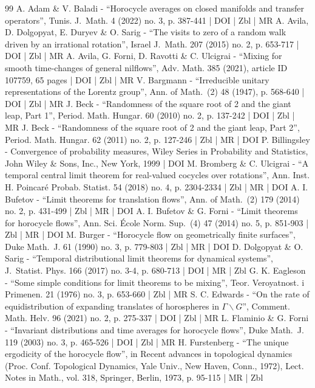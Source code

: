 \begin{thebibliography}{99}
A. Adam \& V. Baladi - “Horocycle averages on closed manifolds and transfer operators”, Tunis. J. Math. 4 (2022) no. 3, p. 387-441 | DOI | Zbl | MR
A. Avila, D. Dolgopyat, E. Duryev \& O. Sarig - “The visits to zero of a random walk driven by an irrational rotation”, Israel J. Math. 207 (2015) no. 2, p. 653-717 | DOI | Zbl | MR
A. Avila, G. Forni, D. Ravotti \& C. Ulcigrai - “Mixing for smooth time-changes of general nilflows”, Adv. Math. 385 (2021), article ID 107759, 65 pages | DOI | Zbl | MR
V. Bargmann - “Irreducible unitary representations of the Lorentz group”, Ann. of Math. (2) 48 (1947), p. 568-640 | DOI | Zbl | MR
J. Beck - “Randomness of the square root of 2 and the giant leap, Part 1”, Period. Math. Hungar. 60 (2010) no. 2, p. 137-242 | DOI | Zbl | MR
J. Beck - “Randomness of the square root of 2 and the giant leap, Part 2”, Period. Math. Hungar. 62 (2011) no. 2, p. 127-246 | Zbl | MR | DOI
P. Billingsley - Convergence of probability measures, Wiley Series in Probability and Statistics, John Wiley \& Sons, Inc., New York, 1999 | DOI
M. Bromberg \& C. Ulcigrai - “A temporal central limit theorem for real-valued cocycles over rotations”, Ann. Inst. H. Poincaré Probab. Statist. 54 (2018) no. 4, p. 2304-2334 | Zbl | MR | DOI
A. I. Bufetov - “Limit theorems for translation flows”, Ann. of Math. (2) 179 (2014) no. 2, p. 431-499 | Zbl | MR | DOI
A. I. Bufetov \& G. Forni - “Limit theorems for horocycle flows”, Ann. Sci. École Norm. Sup. (4) 47 (2014) no. 5, p. 851-903 | Zbl | MR | DOI
M. Burger - “Horocycle flow on geometrically finite surfaces”, Duke Math. J. 61 (1990) no. 3, p. 779-803 | Zbl | MR | DOI
D. Dolgopyat \& O. Sarig - “Temporal distributional limit theorems for dynamical systems”, J. Statist. Phys. 166 (2017) no. 3-4, p. 680-713 | DOI | MR | Zbl
G. K. Eagleson - “Some simple conditions for limit theorems to be mixing”, Teor. Veroyatnost. i Primenen. 21 (1976) no. 3, p. 653-660 | Zbl | MR
S. C. Edwards - “On the rate of equidistribution of expanding translates of horospheres in $\Gamma \backslash G$”, Comment. Math. Helv. 96 (2021) no. 2, p. 275-337 | DOI | Zbl | MR
L. Flaminio \& G. Forni - “Invariant distributions and time averages for horocycle flows”, Duke Math. J. 119 (2003) no. 3, p. 465-526 | DOI | Zbl | MR
H. Furstenberg - “The unique ergodicity of the horocycle flow”, in Recent advances in topological dynamics (Proc. Conf. Topological Dynamics, Yale Univ., New Haven, Conn., 1972), Lect. Notes in Math., vol. 318, Springer, Berlin, 1973, p. 95-115 | MR | Zbl

\end{thebibliography}
